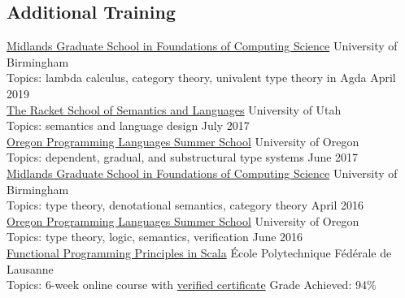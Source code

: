 \documentclass[margin,line]{resume}
\begin{document}
\begin{resume}
      

\section{\mysidestyle Additional Training}

\newcommand\ssitem[5]{\href{#1}{#2} \hfill #3 \\ Topics: #4 \hfill #5}

\ssitem
{http://events.cs.bham.ac.uk/mgs2019/}
{Midlands Graduate School in Foundations of Computing Science}
{University of Birmingham}
{lambda calculus, category theory, univalent type theory in Agda}
{April 2019}\\[\mymedskip] %
\ssitem
{https://summer-school.racket-lang.org/2017/}
{The Racket School of Semantics and Languages}
{University of Utah}
{semantics and language design}
{July 2017}\\[\mymedskip] %
\ssitem
{https://www.cs.uoregon.edu/research/summerschool/summer17}
{Oregon Programming Languages Summer School}
{University of Oregon}
{dependent, gradual, and substructural type systems}
{June 2017}\\[\mymedskip] %
\ssitem
{http://www.cs.bham.ac.uk/~pbl/mgs2016/}
{Midlands Graduate School in Foundations of Computing Science}
{University of Birmingham}
{type theory, denotational semantics, category theory}
{April 2016}\\[\mymedskip] %
\ssitem
{https://www.cs.uoregon.edu/research/summerschool/summer16/}
{Oregon Programming Languages Summer School}
{University of Oregon}
{type theory, logic, semantics, verification}
{June 2016}\\[\mymedskip]  %
\ssitem
{https://www.coursera.org/learn/progfun1}
{Functional Programming Principles in Scala}
{\'{E}cole Polytechnique F\'{e}d\'{e}rale de Lausanne}
{6-week online course with
\href{https://www.coursera.org/account/accomplishments/records/SRLRBNFMFW86}
     {verified certificate}}
{Grade Achieved: 94\%}


\end{resume}
\end{document}
